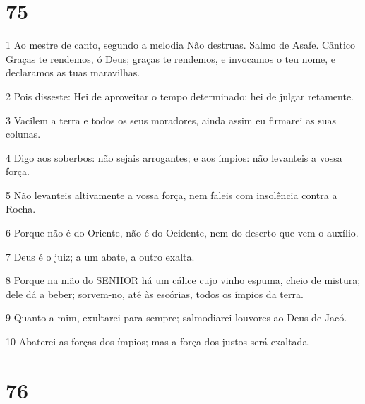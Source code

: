 \chapter{75}

\par 1 Ao mestre de canto, segundo a melodia Não destruas. Salmo de Asafe. Cântico Graças te rendemos, ó Deus; graças te rendemos, e invocamos o teu nome, e declaramos as tuas maravilhas.
\par 2 Pois disseste: Hei de aproveitar o tempo determinado; hei de julgar retamente.
\par 3 Vacilem a terra e todos os seus moradores, ainda assim eu firmarei as suas colunas.
\par 4 Digo aos soberbos: não sejais arrogantes; e aos ímpios: não levanteis a vossa força.
\par 5 Não levanteis altivamente a vossa força, nem faleis com insolência contra a Rocha.
\par 6 Porque não é do Oriente, não é do Ocidente, nem do deserto que vem o auxílio.
\par 7 Deus é o juiz; a um abate, a outro exalta.
\par 8 Porque na mão do SENHOR há um cálice cujo vinho espuma, cheio de mistura; dele dá a beber; sorvem-no, até às escórias, todos os ímpios da terra.
\par 9 Quanto a mim, exultarei para sempre; salmodiarei louvores ao Deus de Jacó.
\par 10 Abaterei as forças dos ímpios; mas a força dos justos será exaltada.

\chapter{76}

